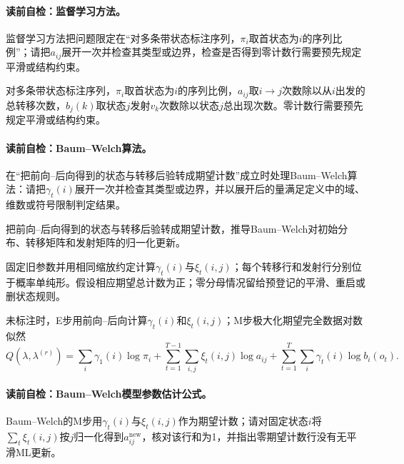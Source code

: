 \paragraph{读前自检：监督学习方法。}监督学习方法把问题限定在“对多条带状态标注序列，$\pi_i$取首状态为$i$的序列比例”；请把$a_{ij}$展开一次并检查其类型或边界，检查是否得到零计数行需要预先规定平滑或结构约束。\par

对多条带状态标注序列，$\pi_i$取首状态为$i$的序列比例，$a_{ij}$取$i\to j$次数除以从$i$出发的总转移次数，$b_j(k)$取状态$j$发射$v_k$次数除以状态$j$总出现次数。零计数行需要预先规定平滑或结构约束。

\paragraph{读前自检：Baum--Welch算法。}在“把前向--后向得到的状态与转移后验转成期望计数”成立时处理Baum--Welch算法：请把$\gamma_t(i)$展开一次并检查其类型或边界，并以展开后的量满足定义中的域、维数或符号限制判定结果。\par

\begingroup
{}

\begin{derivationgoalbox}
把前向--后向得到的状态与转移后验转成期望计数，推导Baum--Welch对初始分布、转移矩阵和发射矩阵的归一化更新。
\end{derivationgoalbox}
\begin{derivationprepbox}
固定旧参数并用相同缩放约定计算$\gamma_t(i)$与$\xi_t(i,j)$；每个转移行和发射行分别位于概率单纯形。假设相应期望总计数为正；零分母情况留给预登记的平滑、重启或删状态规则。
\end{derivationprepbox}
未标注时，E步用前向--后向计算$\gamma_t(i)$和$\xi_t(i,j)$；M步极大化期望完全数据对数似然
\[
Q(\lambda,\lambda^{(r)})=
\sum_i\gamma_1(i)\log\pi_i
+\sum_{t=1}^{T-1}\sum_{i,j}\xi_t(i,j)\log a_{ij}
+\sum_{t=1}^{T}\sum_i\gamma_t(i)\log b_i(o_t).
\]

\paragraph{读前自检：Baum--Welch模型参数估计公式。}Baum--Welch的M步用$\gamma_t(i)$与$\xi_t(i,j)$作为期望计数；请对固定状态$i$将$\sum_t\xi_t(i,j)$按$j$归一化得到$a_{ij}^{\mathrm{new}}$，核对该行和为1，并指出零期望计数行没有无平滑ML更新。\par

